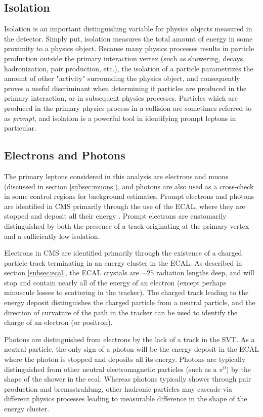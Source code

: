 \subsection{Isolation}
\label{subsec:iso}
Isolation is an important distinguishing variable for physics objects measured in the detector. Simply put, isolation measures the total amount of energy in some proximity to a physics object. Because many physics processes results in particle production outside the primary interaction vertex (such as showering, decays, hadronization, pair production, etc.), the isolation of a particle parametrizes the amount of other "activity" surrounding the physics object, and consequently proves a useful discriminant when determining if particles are produced in the primary interaction, or in subsequent physics processes. Particles which are produced in the primary physics process in a collision are sometimes referred to as {\it prompt}, and isolation is a powerful tool in identifying prompt leptons in particular.

\subsection{Electrons and Photons}
\label{subsec:lepgamme}
The primary leptons considered in this analysis are electrons and muons (discussed in section \ref{subsec:muons}), and photons are also used as a cross-check in some control regions for background estimates. Prompt electrons and photons are identified in CMS primarily through the use of the ECAL, where they are stopped and deposit all their energy \cite{Baffioni:2006cd,Khachatryan:2015iwa}. Prompt electrons are customarily distinguished by both the presence of a track originating at the primary vertex and a sufficiently low isolation.

Electrons in CMS are identified primarily through the existence of a charged particle track terminating in an energy cluster in the ECAL. As described in section \ref{subsec:ecal}, the ECAL crystals are $\sim25$ radiation lengths deep, and will stop and contain nearly all of the energy of an electron (except perhaps minuscule losses to scattering in the tracker). The charged track leading to the energy deposit distinguishes the charged particle from a neutral particle, and the direction of curvature of the path in the tracker can be used to identify the charge of an electron (or positron).

Photons are distinguished from electrons by the lack of a track in the SVT. As a neutral particle, the only sign of a photon will be the energy deposit in the ECAL where the photon is stopped and deposits all its energy. Photons are typically distinguished from other neutral electromagnetic particles (such as a $\pi^0$) by the shape of the shower in the ecal. Whereas photons typically shower through pair production and bremsstrahlung, other hadronic particles may cascade via different physics processes leading to measurable difference in the shape of the energy cluster.

